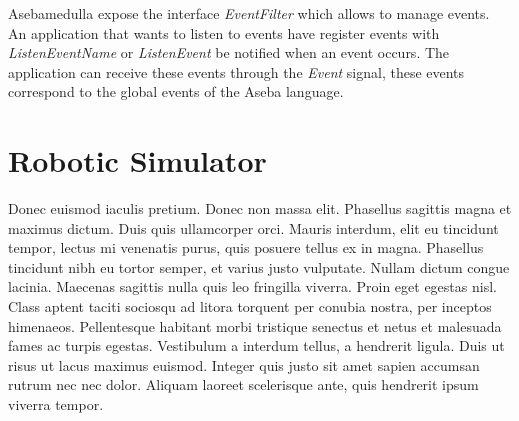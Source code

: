 \documentclass[format=acmsmall, review=false, screen=true]{acmart}
\begin{document}
Asebamedulla expose the interface \emph{EventFilter} which allows to manage events. An application that wants to listen to events have register events with \emph{ListenEventName} or \emph{ListenEvent} be notified when an event occurs. The application can receive these events through the \emph{Event} signal, these events correspond to the global events of the Aseba language.

\section{Robotic Simulator}

Donec euismod iaculis pretium. Donec non massa elit. Phasellus sagittis magna et maximus dictum. Duis quis ullamcorper orci. Mauris interdum, elit eu tincidunt tempor, lectus mi venenatis purus, quis posuere tellus ex in magna. Phasellus tincidunt nibh eu tortor semper, et varius justo vulputate. Nullam dictum congue lacinia. Maecenas sagittis nulla quis leo fringilla viverra. Proin eget egestas nisl. Class aptent taciti sociosqu ad litora torquent per conubia nostra, per inceptos himenaeos. Pellentesque habitant morbi tristique senectus et netus et malesuada fames ac turpis egestas. Vestibulum a interdum tellus, a hendrerit ligula. Duis ut risus ut lacus maximus euismod. Integer quis justo sit amet sapien accumsan rutrum nec nec dolor. Aliquam laoreet scelerisque ante, quis hendrerit ipsum viverra tempor.
\end{document}
